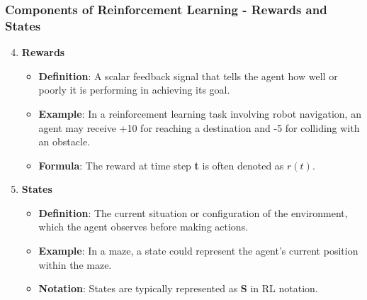 \documentclass[aspectratio=169]{beamer}
\begin{document}
\begin{frame}[fragile]
    \frametitle{Components of Reinforcement Learning - Rewards and States}
    \begin{enumerate}
        \setcounter{enumi}{3}
        \item \textbf{Rewards}
        \begin{itemize}
            \item \textbf{Definition}: A scalar feedback signal that tells the agent how well or poorly it is performing in achieving its goal.
            \item \textbf{Example}: In a reinforcement learning task involving robot navigation, an agent may receive +10 for reaching a destination and -5 for colliding with an obstacle.
            \item \textbf{Formula}: The reward at time step \textbf{t} is often denoted as \( r(t) \).
        \end{itemize}

        \item \textbf{States}
        \begin{itemize}
            \item \textbf{Definition}: The current situation or configuration of the environment, which the agent observes before making actions.
            \item \textbf{Example}: In a maze, a state could represent the agent's current position within the maze.
            \item \textbf{Notation}: States are typically represented as \textbf{S} in RL notation.
        \end{itemize}
    \end{enumerate}
\end{frame}
\end{document}
